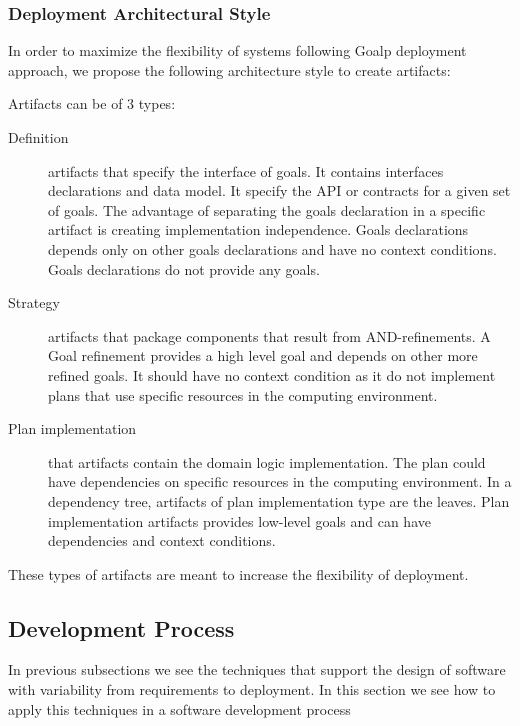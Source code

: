 \subsubsection{Deployment Architectural Style}
\label{depl_arch_style}

In order to maximize the flexibility of systems following Goalp deployment approach, we propose the following architecture style to create artifacts:

Artifacts can be of 3 types:

\begin{description}
  \item[Definition] artifacts that specify the interface of goals. It contains interfaces declarations and data model. It specify the API or contracts for a given set of goals.
  The advantage of separating the goals declaration in a specific artifact is creating implementation independence.
  Goals declarations depends only on other goals declarations and have no context conditions. Goals declarations do not provide any goals.

  \item[Strategy] artifacts that package components that result from AND-refinements. A Goal refinement provides a high level goal and depends on other more refined goals. It should have no context condition as it do not implement plans that use specific resources in the computing environment.

  \item[Plan implementation] that artifacts contain the domain logic implementation. The plan could have dependencies on specific resources in the computing environment.
  In a dependency tree, artifacts of plan implementation type are the leaves.
  Plan implementation artifacts provides low-level goals and can have dependencies and context conditions.

\end{description}

These types of artifacts are meant to increase the flexibility of deployment.


\subsection{Development Process}

In previous subsections we see the techniques that support the design of software with variability from requirements to deployment. In this section we see how to apply this techniques in a software development process

